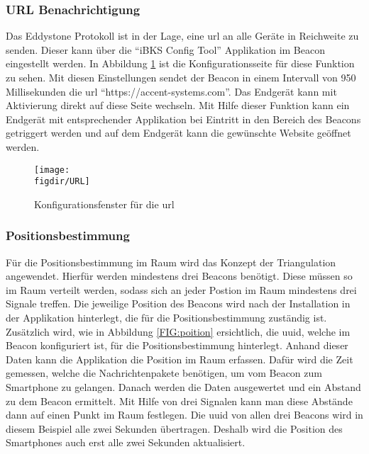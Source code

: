 \subsubsection{URL Benachrichtigung}
\label{sss:ibeacon:url}

Das Eddystone Protokoll ist in der Lage, eine \ac{url} an alle Geräte in Reichweite zu senden. Dieser kann über die "`iBKS Config Tool"' Applikation im Beacon eingestellt werden. In Abbildung \ref{FIG:url} ist die Konfigurationsseite für diese Funktion zu sehen. Mit diesen Einstellungen sendet der Beacon in einem Intervall von 950 Millisekunden die \ac{url} "`https://accent-systems.com"'. Das Endgerät kann mit Aktivierung direkt auf diese Seite wechseln. Mit Hilfe dieser Funktion kann ein Endgerät mit entsprechender Applikation bei Eintritt in den Bereich des Beacons getriggert werden und auf dem Endgerät kann die gewünschte Website geöffnet werden.\\   

\begin{figure}[hbtp]
	\centering
	\texttt{[image: \\figdir/URL]}
	\caption{Konfigurationsfenster für die \ac{url} \cite{BKS:WWW}}
	\label{FIG:url}
\end{figure}

\subsubsection{Positionsbestimmung}
\label{sss:ibeacon:position}

Für die Positionsbestimmung im Raum wird das Konzept der Triangulation angewendet. Hierfür werden mindestens drei Beacons benötigt. Diese müssen so im Raum verteilt werden, sodass sich an jeder Postion im Raum mindestens drei Signale treffen. Die jeweilige Position des Beacons wird nach der Installation in der Applikation hinterlegt, die für die Positionsbestimmung zuständig ist. Zusätzlich wird, wie in Abbildung \ref{FIG:poition} ersichtlich, die \ac{uuid}, welche im Beacon konfiguriert ist, für die Positionsbestimmung hinterlegt. Anhand dieser Daten kann die Applikation die Position im Raum erfassen. Dafür wird die Zeit gemessen, welche die Nachrichtenpakete benötigen, um vom Beacon zum Smartphone zu gelangen. Danach werden die Daten ausgewertet und ein Abstand zu dem Beacon ermittelt. Mit Hilfe von drei Signalen kann man diese Abstände dann auf einen Punkt im Raum festlegen. Die \ac{uuid} von allen drei Beacons wird in diesem Beispiel alle zwei Sekunden übertragen. Deshalb wird die Position des Smartphones auch erst alle zwei Sekunden aktualisiert.\\

